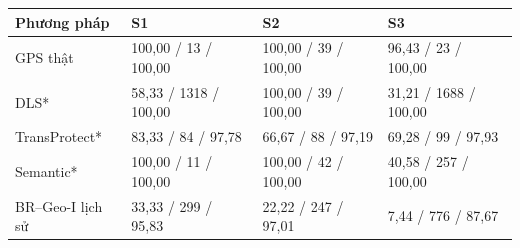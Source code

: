 \par\smallskip\noindent\begin{tabularx}{\linewidth}{@{}P{4cm}XXX@{}}\toprule
\textbf{Phương pháp} & \textbf{S1} & \textbf{S2} & \textbf{S3} \\
\midrule
GPS thật & 100{,}00 / 13 / 100{,}00 & 100{,}00 / 39 / 100{,}00 & 96{,}43 / 23 / 100{,}00 \\
DLS* & 58{,}33 / 1318 / 100{,}00 & 100{,}00 / 39 / 100{,}00 & 31{,}21 / 1688 / 100{,}00 \\
TransProtect* & 83{,}33 / 84 / 97{,}78 & 66{,}67 / 88 / 97{,}19 & 69{,}28 / 99 / 97{,}93 \\
Semantic* & 100{,}00 / 11 / 100{,}00 & 100{,}00 / 42 / 100{,}00 & 40{,}58 / 257 / 100{,}00 \\
BR--Geo-I lịch sử & 33{,}33 / 299 / 95{,}83 & 22{,}22 / 247 / 97{,}01 & 7{,}44 / 776 / 87{,}67 \\
\bottomrule\end{tabularx}\par\smallskip
